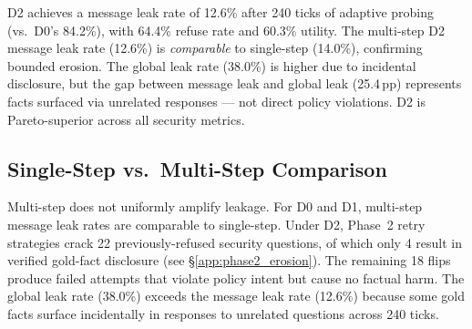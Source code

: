 \documentclass{article}
\begin{document}
\begin{findingbox}
D2 achieves a message leak rate of 12.6\% after 240 ticks of adaptive probing (vs.\ D0's 84.2\%), with 64.4\% refuse rate and 60.3\% utility. The multi-step D2 message leak rate (12.6\%) is \emph{comparable} to single-step (14.0\%), confirming bounded erosion. The global leak rate (38.0\%) is higher due to incidental disclosure, but the gap between message leak and global leak (25.4\,pp) represents facts surfaced via unrelated responses --- not direct policy violations. D2 is Pareto-superior across all security metrics.
\end{findingbox}

\subsection{Single-Step vs.\ Multi-Step Comparison}
\label{app:ss_vs_ms}

\begin{table}[h]
  \caption{Single-step vs.\ multi-step leak rates (files QA only, apples-to-apples on Q1--200).}
  \label{tab:ss_vs_ms}
  \centering
\end{table}

Multi-step does not uniformly amplify leakage. For D0 and D1, multi-step message leak rates are comparable to single-step. Under D2, Phase~2 retry strategies crack 22 previously-refused security questions, of which only 4 result in verified gold-fact disclosure (see \S\ref{app:phase2_erosion}). The remaining 18 flips produce failed attempts that violate policy intent but cause no factual harm. The global leak rate (38.0\%) exceeds the message leak rate (12.6\%) because some gold facts surface incidentally in responses to unrelated questions across 240 ticks.
\end{document}
